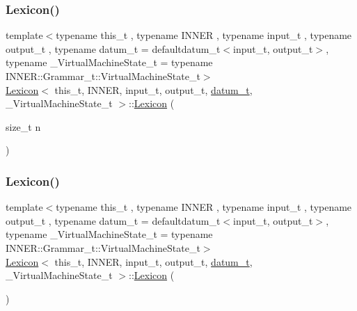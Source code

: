 \subsubsection{\texorpdfstring{Lexicon()}{Lexicon()}\hspace{0.1cm}{\footnotesize\ttfamily [1/2]}}
{\footnotesize\ttfamily template$<$typename this\+\_\+t , typename I\+N\+N\+ER , typename input\+\_\+t , typename output\+\_\+t , typename datum\+\_\+t  = defaultdatum\+\_\+t$<$input\+\_\+t, output\+\_\+t$>$, typename \+\_\+\+Virtual\+Machine\+State\+\_\+t  = typename I\+N\+N\+E\+R\+::\+Grammar\+\_\+t\+::\+Virtual\+Machine\+State\+\_\+t$>$ \\
\hyperlink{class_lexicon}{Lexicon}$<$ this\+\_\+t, I\+N\+N\+ER, input\+\_\+t, output\+\_\+t, \hyperlink{class_bayesable_a9f1a6c0cd7855550fa10b1a8f13a5867}{datum\+\_\+t}, \+\_\+\+Virtual\+Machine\+State\+\_\+t $>$\+::\hyperlink{class_lexicon}{Lexicon} (\begin{DoxyParamCaption}\item[{size\+\_\+t}]{n }\end{DoxyParamCaption})\hspace{0.3cm}{\ttfamily [inline]}}

\mbox{\label{class_lexicon_a60ed551d9c6a52e18f1e8668b89a6fa5}} 
\subsubsection{\texorpdfstring{Lexicon()}{Lexicon()}\hspace{0.1cm}{\footnotesize\ttfamily [2/2]}}
{\footnotesize\ttfamily template$<$typename this\+\_\+t , typename I\+N\+N\+ER , typename input\+\_\+t , typename output\+\_\+t , typename datum\+\_\+t  = defaultdatum\+\_\+t$<$input\+\_\+t, output\+\_\+t$>$, typename \+\_\+\+Virtual\+Machine\+State\+\_\+t  = typename I\+N\+N\+E\+R\+::\+Grammar\+\_\+t\+::\+Virtual\+Machine\+State\+\_\+t$>$ \\
\hyperlink{class_lexicon}{Lexicon}$<$ this\+\_\+t, I\+N\+N\+ER, input\+\_\+t, output\+\_\+t, \hyperlink{class_bayesable_a9f1a6c0cd7855550fa10b1a8f13a5867}{datum\+\_\+t}, \+\_\+\+Virtual\+Machine\+State\+\_\+t $>$\+::\hyperlink{class_lexicon}{Lexicon} (\begin{DoxyParamCaption}{ }\end{DoxyParamCaption})\hspace{0.3cm}{\ttfamily [inline]}}



